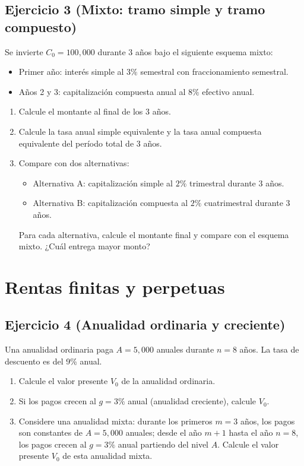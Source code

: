 \documentclass[12pt,a4paper]{article}
\newenvironment{ejercicio}[1]{\subsection*{Ejercicio #1}}{}
\begin{document}
\begin{ejercicio}{3 (Mixto: tramo simple y tramo compuesto)}
Se invierte $C_0=100{,}000$ durante $3$ años bajo el siguiente esquema mixto:
\begin{itemize}
  \item Primer año: interés simple al $3\%$ semestral con fraccionamiento semestral.
  \item Años 2 y 3: capitalización compuesta anual al $8\%$ efectivo anual.
\end{itemize}
\begin{enumerate}[label=\alph*)]
  \item Calcule el montante al final de los $3$ años.
  \item Calcule la tasa anual simple equivalente y la tasa anual compuesta equivalente del período total de $3$ años.
  \item Compare con dos alternativas:
  \begin{itemize}
    \item Alternativa A: capitalización simple al $2\%$ trimestral durante $3$ años.
    \item Alternativa B: capitalización compuesta al $2\%$ cuatrimestral durante $3$ años.
  \end{itemize}
  Para cada alternativa, calcule el montante final y compare con el esquema mixto. ¿Cuál entrega mayor monto?
\end{enumerate}
\end{ejercicio}

\section{Rentas finitas y perpetuas}

\begin{ejercicio}{4 (Anualidad ordinaria y creciente)}
Una anualidad ordinaria paga $A=5{,}000$ anuales durante $n=8$ años. La tasa de descuento es del 9\% anual.
\begin{enumerate}[label=\alph*)]
  \item Calcule el valor presente $V_0$ de la anualidad ordinaria.
  \item Si los pagos crecen al $g=3\%$ anual (anualidad creciente), calcule $V_0$.
  \item Considere una anualidad mixta: durante los primeros $m=3$ años, los pagos son constantes de $A=5{,}000$ anuales; desde el año $m+1$ hasta el año $n=8$, los pagos crecen al $g=3\%$ anual partiendo del nivel $A$. Calcule el valor presente $V_0$ de esta anualidad mixta.
\end{enumerate}
\end{ejercicio}
\end{document}
